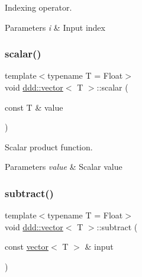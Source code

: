 Indexing operator. 


\begin{DoxyParams}{Parameters}
{\em i} & Input index \\
\hline
\end{DoxyParams}
\mbox{\label{classddd_1_1vector_af54b7b7822b48b3648e147eed92556cb}} 
\subsubsection{\texorpdfstring{scalar()}{scalar()}}
{\footnotesize\ttfamily template$<$typename T = Float$>$ \\
void \hyperlink{classddd_1_1vector}{ddd\+::vector}$<$ T $>$\+::scalar (\begin{DoxyParamCaption}\item[{const T \&}]{value }\end{DoxyParamCaption})\hspace{0.3cm}{\ttfamily [inline]}}



Scalar product function. 


\begin{DoxyParams}{Parameters}
{\em value} & Scalar value \\
\hline
\end{DoxyParams}
\mbox{\label{classddd_1_1vector_abf367c7da55ad2c770a90a3ed3c01d5a}} 
\subsubsection{\texorpdfstring{subtract()}{subtract()}\hspace{0.1cm}{\footnotesize\ttfamily [1/2]}}
{\footnotesize\ttfamily template$<$typename T = Float$>$ \\
void \hyperlink{classddd_1_1vector}{ddd\+::vector}$<$ T $>$\+::subtract (\begin{DoxyParamCaption}\item[{const \hyperlink{classddd_1_1vector}{vector}$<$ T $>$ \&}]{input }\end{DoxyParamCaption})\hspace{0.3cm}{\ttfamily [inline]}}




